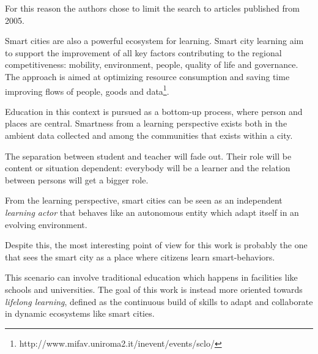 For this reason the authors chose to limit the search to articles published from 2005.

Smart cities are also a powerful ecosystem for learning. Smart city learning aim to support the improvement of all key factors contributing to the regional competitiveness: mobility, environment, people, quality of life and governance. The approach is aimed at optimizing resource consumption and saving time improving flows of people, goods and data\footnote{http://www.mifav.uniroma2.it/inevent/events/sclo/}.

Education in this context is pursued as a bottom-up process, where person and places are central. Smartness from a learning perspective exists both in the ambient data collected and among the communities that exists within a city.

The separation between student and teacher will fade out. Their role will be content or situation dependent: everybody will be a learner and the relation between persons will get a bigger role.

From the learning perspective, smart cities can be seen as an independent \textit{learning actor} that behaves like an autonomous entity which adapt itself in an evolving environment.

Despite this, the most interesting point of view for this work is probably the one that sees the smart city as a place where citizens learn smart-behaviors.

This scenario can involve traditional education which happens in facilities like schools and universities. The goal of this work is instead more oriented towards \textit{lifelong learning}, defined as the continuous build of skills to adapt and collaborate in dynamic ecosystems like smart cities.
